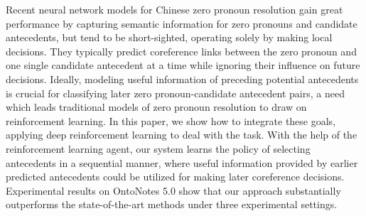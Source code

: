 Recent neural network models for Chinese zero pronoun resolution gain great performance by capturing semantic information for zero pronouns and candidate antecedents, but tend to be short-sighted, operating solely by making local decisions. They typically predict coreference links between the zero pronoun and one single candidate antecedent at a time while ignoring their influence on future decisions. Ideally, modeling useful information of preceding potential antecedents is crucial for classifying later zero pronoun-candidate antecedent pairs, a need which leads traditional models of zero pronoun resolution to draw on reinforcement learning. In this paper, we show how to integrate these goals, applying deep reinforcement learning to deal with the task. With the help of the reinforcement learning agent, our system learns the policy of selecting antecedents in a sequential manner, where useful information provided by earlier predicted antecedents could be utilized for making later coreference decisions. Experimental results on OntoNotes 5.0 show that our approach substantially outperforms the state-of-the-art methods under three experimental settings.
